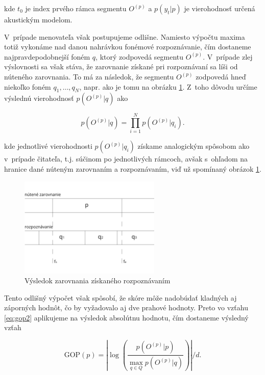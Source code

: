 \noindent kde $t_0$ je index prvého rámca segmentu $O^{(p)}$ a $p(y_t | p)$ je  vierohodnosť určená akustickým modelom.

V~prípade menovateľa však postupujeme odlišne. Namiesto výpočtu maxima totiž vykonáme nad danou nahrávkou fonémové rozpoznávanie, čím dostaneme najpravdepodobnejší foném $q$, ktorý zodpovedá segmentu $O^{(p)}$. V~prípade zlej výslovnosti sa však stáva, že zarovnanie získané pri rozpoznávaní sa líši od núteného zarovnania. To má za následok, že segmentu $O^{(p)}$ zodpovedá hneď niekoľko foném $q_1, \dots, q_N$, napr. ako je tomu na obrázku \ref{fig:gop-phone-loop}. Z~toho dôvodu určíme výslednú vierohodnosť $p(O^{(p)} | q)$ ako 

\begin{equation}
p(O^{(p)} | q) = \prod_{i=1}^N p(O^{(p)} | q_i).
\end{equation}

\noindent kde jednotlivé vierohodnosti $p(O^{(p)} | q_i)$ získame analogickým spôsobom ako v~prípade čitateľa, t.j. súčinom po jednotlivých rámcoch, avšak s~ohľadom na hranice dané núteným zarovnaním a rozpoznávaním, viď už spomínaný obrázok \ref{fig:gop-phone-loop}.

\begin{figure} 
    \centering
    \includegraphics[width=0.6\textwidth]{figures/gop-phone-loop.png}
    \caption{Výsledok zarovnania získaného rozpoznávaním} \label{fig:gop-phone-loop}
\end{figure}

\noindent Tento odlišný výpočet však spôsobí, že skóre môže nadobúdať kladných aj záporných hodnôt, čo by vyžadovalo aj dve prahové hodnoty. Preto vo vzťahu \ref{eq:gop2} aplikujeme na výsledok absolútnu hodnotu, čím dostaneme výsledný vzťah

\begin{equation} \label{eq:gop2}
    \text{GOP}(p) = \left| \log \left( \frac{p(O^{(p)} | p)}{\max_{q \in Q} p(O^{(p)} | q)} \right) \right| \bigg/ d.
\end{equation}

